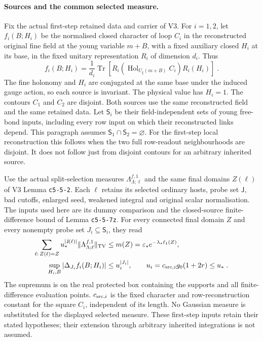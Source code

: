 \documentclass[11pt]{article}
\begin{document}
\paragraph{Sources and the common selected measure.}
Fix the actual first-step retained data and carrier of V3.
For $i=1,2$, let $f_i(B;H_i)$ be the normalised closed character
of loop $C_i$ in the reconstructed original fine field at the
young variable $m+B$, with a fixed auxiliary closed $H_i$ at
its base, in the fixed unitary representation $R_i$ of dimension
$d_i$. Thus
\begin{equation}\label{eq:c8-fourth-two-loop-source}
    f_i(B;H_i)=\frac{1}{d_i}\operatorname{Tr}\left[
        R_i(\operatorname{Hol}_{U_\xi(m+B)}C_i)R_i(H_i)
    \right]\;.
\end{equation}
The fine holonomy and $H_i$ are conjugated at the same base
under the induced gauge action, so each source is invariant.
The physical value has $H_i=1$. The contours $C_1$
and $C_2$ are disjoint. Both sources use the same reconstructed
field and the same retained data. Let $\mathsf S_i$ be their
field-independent sets of young free-bond inputs, including
every row input on which their reconstructed links depend.
This paragraph assumes $\mathsf S_1\cap\mathsf S_2=\varnothing$.
For the first-step local reconstruction this follows when
the two full row-readout neighbourhoods are disjoint. It does
not follow just from disjoint contours for an arbitrary
inherited source.

Use the actual split-selection measures
$\Lambda^{f,1}_{\Lambda;\ell}$ and the same final domains
$Z(\ell)$ of V3 Lemma \texttt{c5-5-2}. Each
$\ell$ retains its selected ordinary hosts, probe set
$\mathsf J$, bad cutoffs, enlarged seed, weakened integral
and original scalar normalisation. The inputs used here are
its dummy comparison and the closed-source finite-difference
bound of Lemma \texttt{c5-5-7z}. For every connected final
domain $Z$ and every nonempty probe set $J_i\subseteq\mathsf S_i$,
they read
\begin{equation}\label{eq:c8-fourth-joint-root-inputs}
    \begin{aligned}
        \sum_{\ell:\,Z(\ell)=Z}
            u_*^{|\mathsf J(\ell)|}
                \|\Lambda^{f,1}_{\Lambda;\ell}\|_{\rm TV}
            &\leq m(Z)
                =\varepsilon_*e^{-\lambda_*\ell_1(Z)},\\
        \sup_{H_i,B}|\Delta_{J_i}f_i(B;H_i)|
            &\leq u_i^{|J_i|},\qquad
        u_i=c_{{\rm src},i} g_0(1+2r)\leq u_*\;.
    \end{aligned}
\end{equation}
The supremum is on the real protected box containing the
supports and all finite-difference evaluation points.
$c_{{\rm src},i}$ is the fixed character and row-reconstruction constant
for the square $C_i$, independent of its length. No Gaussian
measure is substituted for the displayed selected measure.
These first-step inputs retain their stated hypotheses;
their extension through arbitrary inherited integrations
is not assumed.
\end{document}
